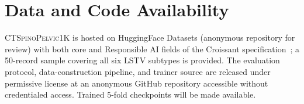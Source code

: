 \documentclass{article}
\newcommand{\dataset}{\textsc{CTSpinoPelvic1K}}
\begin{document}
\section*{Data and Code Availability}

\dataset{} is hosted on HuggingFace Datasets (anonymous
repository for review) with both core and Responsible AI
fields of the Croissant
specification~\citep{Akhtar2024Croissant:Datasets}; a 50-record
sample covering all six LSTV subtypes is provided. The
evaluation protocol, data-construction pipeline, and
trainer source are released under permissive license at an
anonymous GitHub repository accessible without credentialed
access. Trained 5-fold checkpoints will be made available.




\newpage

\end{document}
